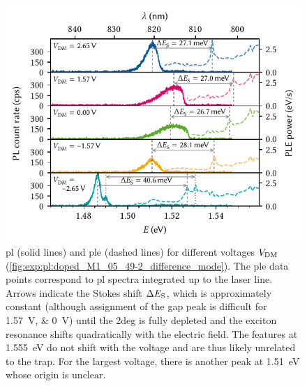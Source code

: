 \begin{figure}
    \centering
    \includegraphics{img/pdf/experiment/doped_M1_05_49-2_ple}
    \caption[
        ,
        .
        \protect\newline
    ]{
        \Gls{pl} (solid lines) and \gls{ple} (dashed lines) for different voltages $V_{\mathrm{DM}}$ (\cf \cref{fig:exp:pl:doped_M1_05_49-2_difference_mode}).
        The \gls{ple} data points correspond to \gls{pl} spectra integrated up to the laser line.
        Arrows indicate the Stokes shift $\Delta E_{\mathrm{S}}$, which is approximately constant (although assignment of the gap peak is difficult for \qtylist{1.57;0}{\volt}) until the \gls{2deg} is fully depleted and the exciton resonance shifts quadratically with the electric field.
        The features at \qty{1.555}{\electronvolt} do not shift with the voltage and are thus likely unrelated to the trap.
        For the largest voltage, there is another peak at \qty{1.51}{\electronvolt} whose origin is unclear.
    }
    \label{fig:exp:pl:doped_M1_05_49-2_ple}
\end{figure}

